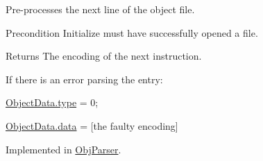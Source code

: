 Pre-\/processes the next line of the object file. 

\begin{DoxyPrecond}{Precondition}
Initialize must have successfully opened a file. 
\end{DoxyPrecond}
\begin{DoxyReturn}{Returns}
The encoding of the next instruction.
\end{DoxyReturn}
If there is an error parsing the entry: \begin{DoxyItemize}
\item \hyperlink{structObjectData_a77f1a74deb864606b1b5cc115c2a99a5}{ObjectData.type} = 0; \item \hyperlink{structObjectData_af755ea276bafd67e377e869950c1eb48}{ObjectData.data} = \mbox{[}the faulty encoding\mbox{]} \end{DoxyItemize}


Implemented in \hyperlink{classObjParser_a653f83071fd63e3fdf04f28699f2fff5}{ObjParser}.

